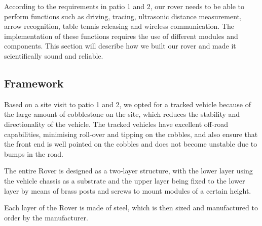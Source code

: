 \documentclass[12pt, a4paper, oneside]{report}
\begin{document}
According to the requirements in patio 1 and 2, our rover needs to be able to perform functions such as driving, tracing, ultrasonic distance measurement, arrow recognition, table tennis releasing and wireless communication. The implementation of these functions requires the use of different modules and components. This section will describe how we built our rover and made it scientifically sound and reliable.

\subsection{Framework}
Based on a site visit to patio 1 and 2, we opted for a tracked vehicle because of the large amount of cobblestone on the site, which reduces the stability and directionality of the vehicle. The tracked vehicles have excellent off-road capabilities, minimising roll-over and tipping on the cobbles, and also ensure that the front end is well pointed on the cobbles and does not become unstable due to bumps in the road.
	
The entire Rover is designed as a two-layer structure, with the lower layer using the vehicle chassis as a substrate and the upper layer being fixed to the lower layer by means of brass posts and screws to mount modules of a certain height.
	
Each layer of the Rover is made of steel, which is then sized and manufactured to order by the manufacturer.
\end{document}
